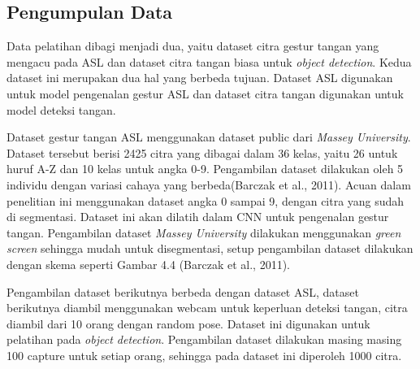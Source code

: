 \subsection{Pengumpulan Data}
Data pelatihan dibagi menjadi dua, yaitu dataset citra gestur tangan yang mengacu pada ASL dan dataset citra tangan biasa untuk \emph{object detection}.
Kedua dataset ini merupakan dua hal yang berbeda tujuan. 
Dataset ASL digunakan untuk model pengenalan gestur ASL dan dataset citra tangan digunakan untuk model deteksi tangan.

Dataset gestur tangan ASL menggunakan dataset public dari \emph{Massey University}. Dataset tersebut berisi 2425 citra yang dibagai dalam 36 kelas, yaitu 26 untuk huruf A-Z dan 10 kelas untuk angka 0-9. Pengambilan dataset dilakukan oleh 5 individu dengan variasi cahaya yang berbeda(Barczak et al., 2011).
Acuan dalam penelitian ini menggunakan dataset angka 0 sampai 9, dengan citra yang sudah di segmentasi.
Dataset ini akan dilatih dalam CNN untuk pengenalan gestur tangan.
Pengambilan dataset \emph{Massey University} dilakukan menggunakan \emph{green screen} sehingga mudah untuk disegmentasi, setup pengambilan dataset dilakukan dengan skema seperti Gambar 4.4 (Barczak et al., 2011).

Pengambilan dataset berikutnya berbeda dengan dataset ASL, dataset berikutnya diambil menggunakan webcam untuk keperluan deteksi tangan, citra diambil dari 10 orang dengan random pose. Dataset ini digunakan untuk pelatihan pada \emph{object detection}. 
Pengambilan dataset dilakukan masing masing 100 capture untuk setiap orang, sehingga pada dataset ini diperoleh 1000 citra. 

